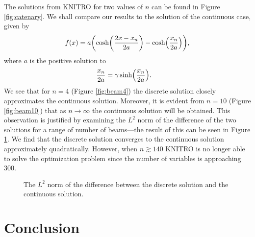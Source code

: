 \documentclass[11pt,a4paper,twocolumn]{article}
\let\originalleft\left
\let\originalright\right
\renewcommand{\left}{\mathopen{}\mathclose\bgroup\originalleft}
\renewcommand{\right}{\aftergroup\egroup\originalright}
\begin{document}
The solutions from KNITRO for two values of $n$ can be found in Figure \ref{fig:catenary}. We shall compare our results to the solution of the continuous case, given by
\begin{align}
	f(x) = a \left( \cosh \left( \frac{2x - x_n}{2a} \right) - \cosh \left( \frac{x_n}{2a} \right) \right),
\end{align}
where $a$ is the positive solution to
\begin{align}
	\frac{x_n}{2a} &= \gamma \sinh \left( \frac{x_n}{2a} \right).
\end{align}
We see that for $n = 4$ (Figure \ref{fig:beam4}) the discrete solution closely approximates the continuous solution. Moreover, it is evident from $n = 10$ (Figure \ref{fig:beam10}) that as $n \rightarrow \infty$ the continuous solution will be obtained. This observation is justified by examining the $L^2$ norm of the difference of the two solutions for a range of number of beams---the result of this can be seen in Figure \ref{fig:convergence}. We find that the discrete solution converges to the continuous solution approximately quadratically. However, when $n \gtrsim 140$ KNITRO is no longer able to solve the optimization problem since the number of variables is approaching $300$.

\begin{figure}[tbp]
	\centering
	
	\caption{The $L^2$ norm of the difference between the discrete solution and the continuous solution.}
	\label{fig:convergence}
\end{figure}

\section{Conclusion}

%
\end{document}
